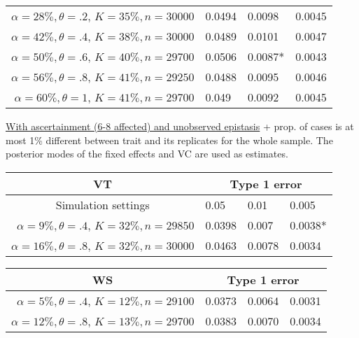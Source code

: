\documentclass[11pt,a4paper]{article}
\begin{document}
\begin{table}[ht]
\begin{minipage}[b]{.7\linewidth}
\begin{tabular}{r|lll}
$\alpha = 28\%, \theta = .2$, $K=35\%, n=30000$ &   0.0494& 0.0098 &0.0045 \\ 
$\alpha = 42\%, \theta = .4$, $K=38\%, n=30000$ &   0.0489& 0.0101 &0.0047 \\ 
$\alpha = 50\%, \theta = .6$, $K=40\%, n=29700$ &   0.0506& 0.0087* &0.0043 \\ 
$\alpha = 56\%, \theta = .8$, $K=41\%, n=29250$ &   0.0488& 0.0095 &0.0046 \\ 
$\alpha = 60\%, \theta = 1$, $K=41\%, n=29700$ &   0.049& 0.0092 &0.0045 \\ 
\end{tabular}
\end{minipage}
\end{table}

\underline{With ascertainment (6-8 affected) and unobserved epistasis} + prop. of cases is at most 1\% different between trait and its replicates for the whole sample. The posterior modes of the fixed effects and VC are used as estimates.

\begin{table}[ht]
\centering
\begin{tabular}{r|lll}
\multicolumn{1}{c|}{\bf VT}&\multicolumn{3}{c}{Type 1 error}\\
  \hline
\multicolumn{1}{c|}{Simulation settings} & 0.05 & 0.01 & 0.005 \\ 
  \hline
$\alpha = 9\%, \theta = .4$, $K=32\%, n=29850$ &   0.0398& 0.007 &0.0038* \\  
$\alpha = 16\%, \theta = .8$, $K=32\%, n=30000$ &   0.0463& 0.0078 &0.0034 \\ 
\end{tabular}

\vspace{.5cm}
\centering
\begin{tabular}{r|lll}
\multicolumn{1}{c|}{\bf WS}&\multicolumn{3}{c}{Type 1 error}\\
   \hline %
$\alpha = 5\%, \theta = .4$, $K=12\%, n=29100$ &   0.0373& 0.0064 &0.0031 \\ 
$\alpha = 12\%, \theta = .8$, $K=13\%, n=29700$ &   0.0383& 0.0070 &0.0034 \\ 
\end{tabular}
\end{table}
\end{document}
